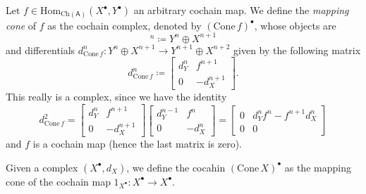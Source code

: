 \begin{defn}
	Let $f \in \mathrm{Hom}_{\mathrm{Ch}(\mathsf{A})} \left( X^\bullet, Y^\bullet \right)$ an arbitrary cochain map.
	We define the {\em mapping cone} of $f$ as the cochain complex,
	denoted by $(\mathrm{Cone}\, f)^\bullet$, whose objects are
	\begin{equation}
		[\mathrm{Cone}\, f]^n \coloneqq Y^n \oplus X^{n+1}
	\end{equation} 
	and differentials $d^n_{\mathrm{Cone}\, f}\colon Y^n \oplus X^{n+1} \to Y^{n+1} \oplus X^{n+2}$ given by
	the following matrix
	\begin{equation}
	d^n_{\mathrm{Cone}\, f} \coloneqq
	\begin{bmatrix}
		d^n_Y & f^{n+1}\\
		0 & -d_X^{n+1}
	\end{bmatrix} 
	.\end{equation} 
	This really is a complex, since we have the identity
	\begin{equation}
	d^2_{\mathrm{Cone}\, f} =
	\begin{bmatrix}
		d^n_Y & f^{n+1}\\
		0 & -d_X^{n+1}
	\end{bmatrix} 
	\begin{bmatrix}
		d^{n-1}_Y & f^{n}\\
		0 & -d_X^{n}
	\end{bmatrix}  = 
	\begin{bmatrix}
		0 & d^n_Y f^n - f^{n+1} d^n_X\\
		0 & 0
	\end{bmatrix} 
	\end{equation} 
	and $f$ is a cochain map (hence the last matrix is zero).
\end{defn}

\begin{defn}
	Given a complex $\left( X^{\bullet}, d_{X} \right)$, we define the cocahin $(\mathrm{Cone}\, X)^\bullet$ as the
	mapping cone of the cochain map $1_{X^\bullet}\colon X^\bullet \to X^\bullet$.
\end{defn}


